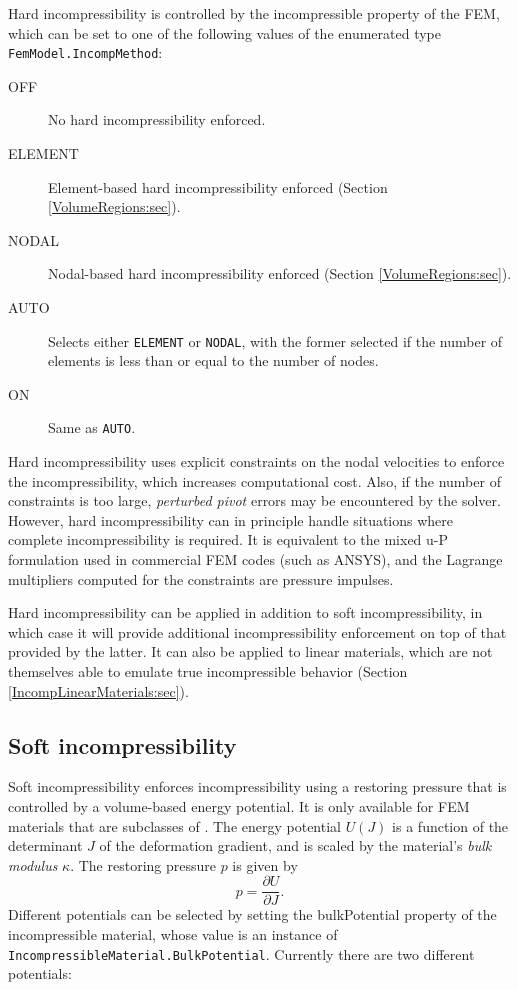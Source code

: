 Hard incompressibility is controlled by the {\sf incompressible}
property of the FEM, which can be set to one of the following values
of the enumerated type {\tt FemModel.IncompMethod}:

\begin{description}

\item[OFF] No hard incompressibility enforced.

\item[ELEMENT] Element-based hard incompressibility enforced
(Section \ref{VolumeRegions:sec}).

\item[NODAL] Nodal-based hard incompressibility enforced
(Section \ref{VolumeRegions:sec}).

\item[AUTO] Selects either {\tt ELEMENT} or {\tt NODAL},
with the former selected if the number of elements is less than or
equal to the number of nodes.

\item[ON] Same as {\tt AUTO}.

\end{description}

Hard incompressibility uses explicit constraints on the nodal
velocities to enforce the incompressibility, which increases
computational cost. Also, if the number of constraints is too large,
{\it perturbed pivot} errors may be encountered by the solver.
However, hard incompressibility can in principle handle situations
where complete incompressibility is required. It is equivalent to the
mixed u-P formulation used in commercial FEM codes (such as ANSYS),
and the Lagrange multipliers computed for the constraints are pressure
impulses.

Hard incompressibility can be applied in addition to soft
incompressibility, in which case it will provide additional
incompressibility enforcement on top of that provided by the latter.
It can also be applied to linear materials, which are not themselves
able to emulate true incompressible behavior
(Section \ref{IncompLinearMaterials:sec}).

\subsection{Soft incompressibility}
\label{SoftIncomp:sec}

Soft incompressibility enforces incompressibility using a restoring
pressure that is controlled by a volume-based energy potential. It is
only available for FEM materials that are subclasses of
.
The energy potential $U(J)$ is a function of the determinant $J$ of the
deformation gradient, and is scaled by the material's {\it bulk modulus}
$\kappa$. The restoring pressure $p$ is given by
%
\begin{equation}
p = \frac{\partial U}{\partial J}.
\end{equation}
%
Different potentials can be selected by setting the {\sf bulkPotential}
property of the incompressible material, whose value is an instance of
{\tt IncompressibleMaterial.BulkPotential}.  Currently
there are two different potentials:

